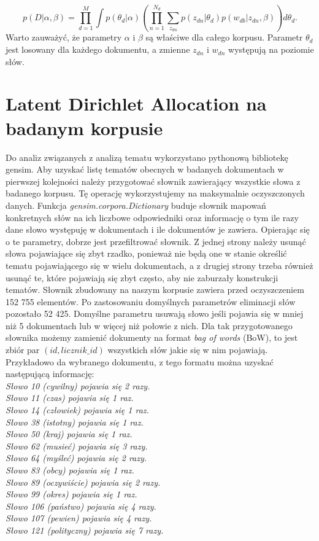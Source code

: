 \documentclass[a4paper,11pt,twoside]{report}
\theoremstyle{definition}
\begin{document}
\begin{equation}
p(D|\alpha,\beta) = \prod_{d=1}^M \int p(\theta_d |\alpha) \left(\prod_{n=1}^{N_d} \sum_{z_{dn}} p(z_{dn}|\theta_d)p(w_{db}|z_{dn}, \beta) \right) d\theta_d.
 \end{equation}
Warto zauważyć, że parametry $\alpha$ i $\beta$ są właściwe dla całego korpusu. Parametr $\theta_d$ jest losowany dla każdego dokumentu, a zmienne $z_{dn}$ i $w_{dn}$ występują na poziomie słów.

\section{Latent Dirichlet Allocation na badanym korpusie}
Do analiz związanych z analizą tematu wykorzystano pythonową bibliotekę gensim. 
Aby uzyskać listę tematów obecnych w badanych dokumentach w pierwszej kolejności należy przygotować słownik zawierający wszystkie słowa z badanego korpusu. Tę operację wykorzystujemy na maksymalnie oczyszczonych danych. Funkcja \textit{ gensim.corpora.Dictionary} buduje słownik mapowań konkretnych słów na ich liczbowe odpowiedniki oraz informację o tym ile razy dane słowo występuję w dokumentach i ile dokumentów je zawiera. Opierając się o te parametry, dobrze jest przefiltrować słownik. Z jednej strony należy usunąć słowa pojawiające się zbyt rzadko, ponieważ nie będą one w stanie określić tematu pojawiającego się w wielu dokumentach, a z drugiej strony trzeba również usunąć te, które pojawiają się zbyt często, aby nie zaburzały konstrukcji tematów.
Słownik zbudowany na naszym korpusie zawiera przed oczyszczeniem 152 755 elementów. Po zastosowaniu domyślnych parametrów eliminacji słów pozostało 52 425. Domyślne parametru usuwają słowo jeśli pojawia się w mniej niż 5 dokumentach lub w więcej niż połowie z nich.
Dla tak przygotowanego słownika możemy zamienić dokumenty na format \textit{bag of words} (BoW), to jest zbiór par $(id, licznik\_id)$ wszystkich słów jakie się w nim pojawiają. Przykładowo da wybranego dokumentu, z tego formatu można uzyskać następującą informację:\\
\textit{Słowo 10 (cywilny) pojawia się 2 razy.\\
Słowo 11 (czas) pojawia się 1 raz.\\
Słowo 14 (człowiek) pojawia się 1 raz.\\
Słowo 38 (istotny) pojawia się 1 raz.\\
Słowo 50 (kraj) pojawia się 1 raz.\\
Słowo 62 (musieć) pojawia się 3 razy.\\
Słowo 64 (myśleć) pojawia się 2 razy.\\
Słowo 83 (obcy) pojawia się 1 raz.\\
Słowo 89 (oczywiście) pojawia się 2 razy.\\
Słowo 99 (okres) pojawia się 1 raz.\\
Słowo 106 (państwo) pojawia się 4 razy.\\
Słowo 107 (pewien) pojawia się 4 razy.\\
Słowo 121 (polityczny) pojawia się 7 razy.}
\end{document}
